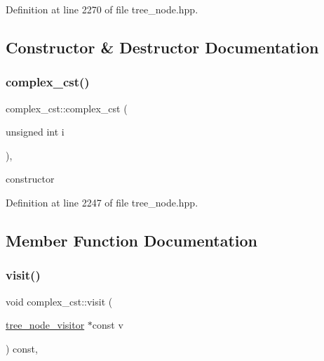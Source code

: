 Definition at line 2270 of file tree\+\_\+node.\+hpp.



\subsection{Constructor \& Destructor Documentation}
\mbox{\label{structcomplex__cst_afdb8800e87381d37211659eedf9507cb}} 
\subsubsection{\texorpdfstring{complex\+\_\+cst()}{complex\_cst()}}
{\footnotesize\ttfamily complex\+\_\+cst\+::complex\+\_\+cst (\begin{DoxyParamCaption}\item[{unsigned int}]{i }\end{DoxyParamCaption})\hspace{0.3cm}{\ttfamily [inline]}, {\ttfamily [explicit]}}



constructor 



Definition at line 2247 of file tree\+\_\+node.\+hpp.



\subsection{Member Function Documentation}
\mbox{\label{structcomplex__cst_aa98d0db16f586dd9ca9b16a468b67d2e}} 
\subsubsection{\texorpdfstring{visit()}{visit()}}
{\footnotesize\ttfamily void complex\+\_\+cst\+::visit (\begin{DoxyParamCaption}\item[{\hyperlink{classtree__node__visitor}{tree\+\_\+node\+\_\+visitor} $\ast$const}]{v }\end{DoxyParamCaption}) const\hspace{0.3cm}{\ttfamily [override]}, {\ttfamily [virtual]}}



